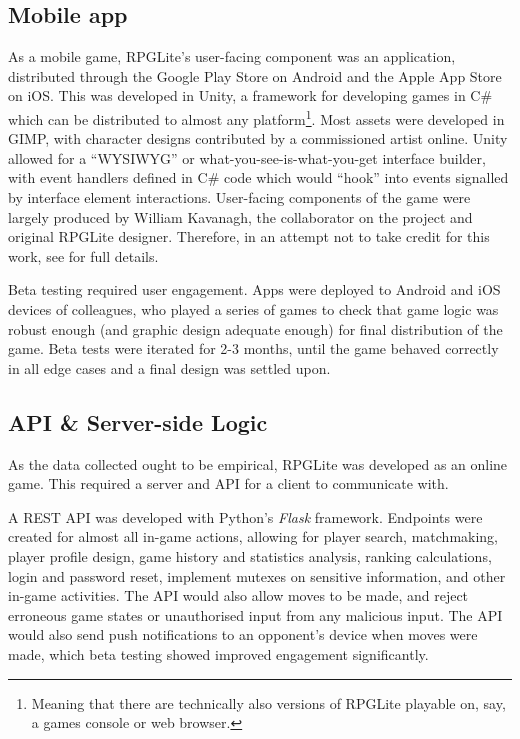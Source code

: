 \subsection{Mobile app}

As a mobile game, RPGLite's user-facing component was an application,
distributed through the Google Play Store on Android and the Apple App Store on
iOS. This was developed in Unity, a framework for developing games in C\# which
can be distributed to almost any platform\footnote{Meaning that there are
technically also versions of RPGLite playable on, say, a games console or web
browser.}. Most assets were developed in GIMP, with character designs
contributed by a commissioned artist online. Unity allowed for a ``WYSIWYG'' or
what-you-see-is-what-you-get interface builder, with event handlers defined in
C\# code which would ``hook'' into events signalled by interface element
interactions. User-facing components of the game were largely produced by
William Kavanagh, the collaborator on the project and original RPGLite designer.
Therefore, in an attempt not to take credit for this work, see  for full details.

Beta testing required user engagement. Apps were deployed to Android and iOS
devices of colleagues, who played a series of games to check that game logic was
robust enough (and graphic design adequate enough) for final distribution of the
game. Beta tests were iterated for 2-3 months, until the game behaved correctly
in all edge cases and a final design was settled upon. 


\subsection{API \& Server-side Logic}

As the data collected ought to be empirical, RPGLite was developed as an online
game. This required a server and API for a client to communicate with.

A REST API was developed with Python's \emph{Flask} framework. Endpoints were
created for almost all in-game actions, allowing for player search, matchmaking,
player profile design, game history and statistics analysis, ranking
calculations, login and password reset, implement mutexes on sensitive
information, and other in-game activities. The API would also allow moves to be
made, and reject erroneous game states or unauthorised input from any malicious
input. The API would also send push notifications to an opponent's device when
moves were made, which beta testing showed improved engagement significantly.

